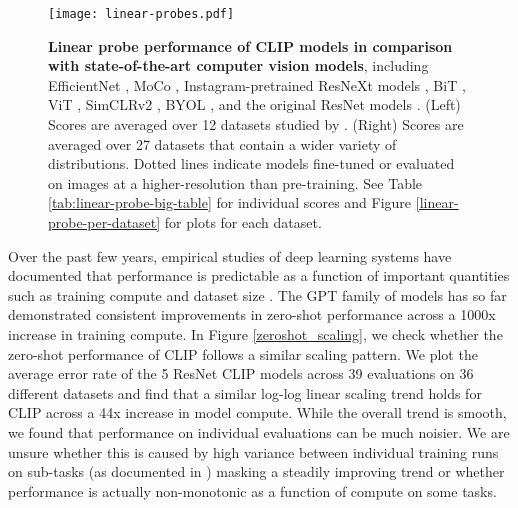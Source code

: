 \documentclass{article}
\begin{document}
\begin{figure*}[t]
\texttt{[image: linear-probes.pdf]}
\vspace{-2em}
\caption{\textbf{Linear probe performance of CLIP models in comparison with state-of-the-art computer vision models}, including EfficientNet \cite{tan2019efficientnet,xie2020self}, MoCo \cite{chen2020mocov2}, Instagram-pretrained ResNeXt models \cite{mahajan2018exploring,touvron2019fixing}, BiT \cite{kolesnikov2019large}, ViT \cite{dosovitskiy2020image}, SimCLRv2 \cite{chen2020big}, BYOL \cite{grill2020byol}, and the original ResNet models \cite{he2016resnet}. (Left) Scores are averaged over 12 datasets studied by \citet{kornblith2019better}. (Right) Scores are averaged over 27 datasets that contain a wider variety of distributions. Dotted lines indicate models fine-tuned or evaluated on images at a higher-resolution than pre-training. See Table \ref{tab:linear-probe-big-table} for individual scores and Figure \ref{linear-probe-per-dataset} for plots for each dataset.}
\label{fig:linear-probe-graph}
\end{figure*}

Over the past few years, empirical studies of deep learning systems have documented that performance is predictable as a function of important quantities such as training compute and dataset size \cite{hestness2017deep,kaplan2020scaling}. The GPT family of models has so far demonstrated consistent improvements in zero-shot performance across a 1000x increase in training compute. In Figure \ref{zeroshot_scaling}, we check whether the zero-shot performance of CLIP follows a similar scaling pattern. We plot the average error rate of the 5 ResNet CLIP models across 39 evaluations on 36 different datasets and find that a similar log-log linear scaling trend holds for CLIP across a 44x increase in model compute. While the overall trend is smooth, we found that performance on individual evaluations can be much noisier. We are unsure whether this is caused by high variance between individual training runs on sub-tasks (as documented in \citet{d2020underspecification}) masking a steadily improving trend or whether performance is actually non-monotonic as a function of compute on some tasks.
\end{document}
